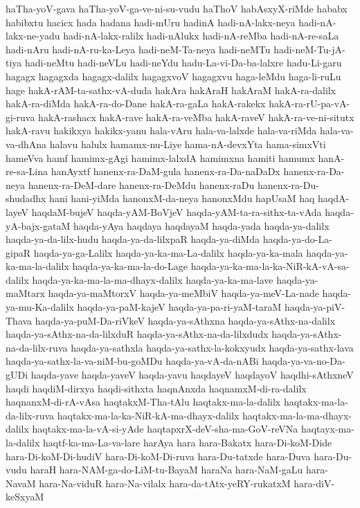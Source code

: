 {haTha-yoV-gava
haTha-yoV-ga-ve-ni-su-vudu
haThoV
habAsxyX-riMde
hababx
habibxtu
hacicx
hada
hadana
hadi-mUru
hadinA
hadi-nA-lakx-neya
hadi-nA-lakx-ne-yadu
hadi-nA-lakx-ralilx
hadi-nAlukx
hadi-nA-reMba
hadi-nA-re-saLa
hadi-nAru
hadi-nA-ru-ka-Leya
hadi-neM-Ta-neya
hadi-neMTu
hadi-neM-Tu-jA-tiya
hadi-neMtu
hadi-neVLu
hadi-neYdu
hadu-La-vi-Da-ba-lalxre
hadu-Li-garu
hagagx
hagagxda
hagagx-dalilx
hagagxvoV
hagagxvu
haga-leMdu
haga-li-ruLu
hage
hakA-rAM-ta-sathx-vA-duda
hakAra
hakAraH
hakAraM
hakA-ra-dalilx
hakA-ra-diMda
hakA-ra-do-Dane
hakA-ra-gaLa
hakA-rakekx
hakA-ra-rU-pa-vA-gi-ruva
hakA-rashacx
hakA-rave
hakA-ra-veMba
hakA-raveV
hakA-ra-ve-ni-situtx
hakA-ravu
hakikxya
hakikx-yanu
hala-vAru
hala-va-lalxde
hala-va-riMda
hala-va-va-dhAna
halavu
halulx
hamamx-nu-Liye
hama-nA-devxYta
hama-simxVti
hameVva
hamf
hamimx-gAgi
hamimx-lalxdA
hamimxna
hamiti
hamumx
hanA-re-sa-Lina
hanAyxtf
hanenx-ra-DaM-gula
hanenx-ra-Da-naDaDx
hanenx-ra-Da-neya
hanenx-ra-DeM-dare
hanenx-ra-DeMdu
hanenx-raDu
hanenx-ra-Du-shudadhx
hani
hani-yiMda
hanonxM-da-neya
hanonxMdu
hapUsaM
haq
haqdA-layeV
haqdaM-bujeV
haqda-yAM-BoVjeV
haqda-yAM-ta-ra-sithx-ta-vAda
haqda-yA-bajx-gataM
haqda-yAya
haqdaya
haqdayaM
haqda-yada
haqda-ya-dalilx
haqda-ya-da-lilx-hudu
haqda-ya-da-lilxpaR
haqda-ya-diMda
haqda-ya-do-La-gipaR
haqda-ya-ga-Lalilx
haqda-ya-ka-ma-La-dalilx
haqda-ya-ka-mala
haqda-ya-ka-ma-la-dalilx
haqda-ya-ka-ma-la-do-Lage
haqda-ya-ka-ma-la-ka-NiR-kA-vA-sa-dalilx
haqda-ya-ka-ma-la-ma-dhayx-dalilx
haqda-ya-ka-ma-lave
haqda-ya-maMtarx
haqda-ya-maMtorxV
haqda-ya-meMbiV
haqda-ya-meV-La-nade
haqda-ya-mu-Ka-dalilx
haqda-ya-paM-kajeV
haqda-ya-pa-ri-yaM-taraM
haqda-ya-piV-Thava
haqda-ya-puM-Da-riVkeV
haqda-ya-sAthxna
haqda-ya-sAthx-na-dalilx
haqda-ya-sAthx-na-da-lilxduR
haqda-ya-sAthx-na-da-lilxdudx
haqda-ya-sAthx-na-da-lilx-ruva
haqda-ya-sathxla
haqda-ya-sathx-la-kokxyudx
haqda-ya-sathx-lava
haqda-ya-sathx-la-va-niM-bu-goMDu
haqda-ya-vA-da-nABi
haqda-ya-va-no-Da-gUDi
haqda-yave
haqda-yaveV
haqda-yavu
haqdayeV
haqdayoV
haqdhi-sAthxneV
haqdi
haqdiM-dirxya
haqdi-sithxta
haqnAnxda
haqnamxM-di-ra-dalilx
haqnanxM-di-rA-vAsa
haqtakxM-Tha-tAlu
haqtakx-ma-la-dalilx
haqtakx-ma-la-da-lilx-ruva
haqtakx-ma-la-ka-NiR-kA-ma-dhayx-dalilx
haqtakx-ma-la-ma-dhayx-dalilx
haqtakx-ma-la-vA-si-yAde
haqtapxrX-deV-sha-ma-GoV-reVNa
haqtayx-ma-la-dalilx
haqtf-ka-ma-La-va-lare
harAya
hara
hara-Bakatx
hara-Di-koM-Dide
hara-Di-koM-Di-hudiV
hara-Di-koM-Di-ruva
hara-Du-tatxde
hara-Duva
hara-Du-vudu
haraH
hara-NAM-ga-do-LiM-tu-BayaM
haraNa
hara-NaM-gaLu
hara-NavaM
hara-Na-viduR
hara-Na-vilalx
hara-da-tAtx-yeRY-rukatxM
hara-diV-keSxyaM
}
